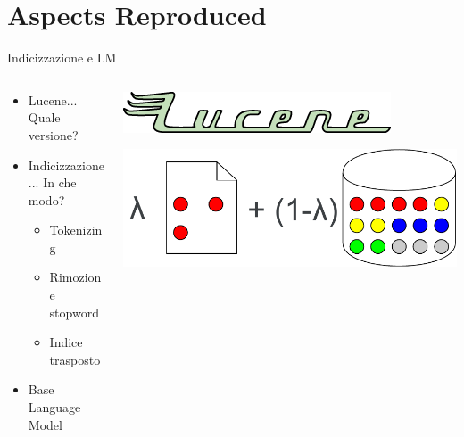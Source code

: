 \section{Aspects Reproduced}
\begin{frame}{Indicizzazione e LM}
    \begin{columns}
        \begin{column}{0.5\textwidth}
            \begin{itemize}
                \item Lucene... Quale versione?
            \end{itemize}
            \bigskip
            \begin{itemize}
                \item Indicizzazione... In che modo?
                      \begin{itemize}
                          \item Tokenizing
                          \item Rimozione stopword
                          \item Indice trasposto
                      \end{itemize}
            \end{itemize}
            \bigskip
            \begin{itemize}
                \item Base Language Model
            \end{itemize}
        \end{column}
        \begin{column}{0.5\textwidth}

            \bigskip
            \includegraphics[width=\columnwidth]{img/lucene_logo.png}
            
            \bigskip
            \bigskip
            \bigskip
            \bigskip
            \bigskip
            \bigskip
            \includegraphics[width=\columnwidth]{img/lm.pdf}
        \end{column}
    \end{columns}
\end{frame}

